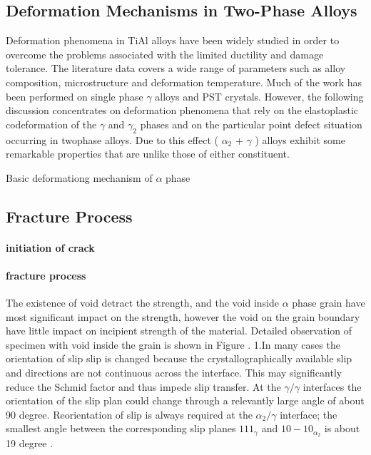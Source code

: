 \documentclass[times,12pt]{elsarticle}
\begin{document}
\subsection{Deformation Mechanisms in Two-Phase Alloys}

Deformation phenomena in TiAl alloys have been widely studied in order to overcome the problems associated with the limited ductility and damage tolerance. The literature data covers a wide range of parameters such as alloy composition, microstructure and deformation temperature. Much of the work has been performed on single phase $\gamma$ alloys and PST crystals. However, the following discussion concentrates on deformation phenomena that rely on the elastoplastic codeformation of the $\gamma$ and $\gamma_2$ phases and on the particular point defect situation occurring in twophase alloys. Due to this effect ( $\alpha_2$ + $\gamma$ ) alloys exhibit some remarkable properties that are unlike those of either constituent.

Basic deformationg mechanism of $\alpha$ phase 

\subsection{Fracture Process}
\paragraph{initiation of crack}
\paragraph{fracture process}
The existence of void detract the strength, and the void inside $\alpha$ phase grain have most significant  impact on the strength, however the void on the grain boundary have little impact on incipient strength of the material. Detailed observation of specimen with void inside the grain is shown in Figure \cite{}.
1.In many cases the orientation of slip slip is changed because the crystallographically available slip and directions are not continuous across the interface. This may significantly reduce the Schmid factor and thus impede slip transfer. At the $\gamma/\gamma$ interfaces the orientation of the slip plan could change through a relevantly large angle of about 90 degree. Reorientation of slip is always required at the $\alpha_{2}/\gamma$ interface; the smallest angle between the corresponding slip planes ${1 1 1 }_{\gamma}$ and ${ 1 0 -1 0}_{\alpha_2}$ is about 19 degree \cite{}.
\end{document}
